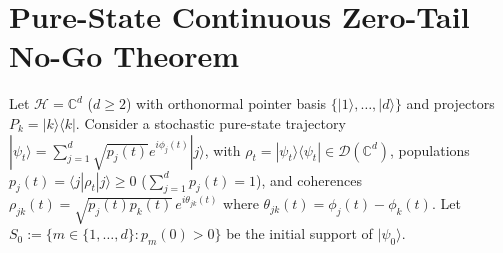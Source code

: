 \documentclass[aps,pra,10pt,twocolumn,superscriptaddress,amsmath,amssymb,floatfix]{revtex4-2}
\newcommand{\ket}[1]{|#1\rangle}
\newcommand{\bra}[1]{\langle #1|}
\newcommand{\ketbra}[2]{|#1\rangle\langle #2|}
\begin{document}
\section{Pure-State Continuous Zero-Tail No-Go Theorem}
\label{sec:nogo}

Let $\mathcal{H} = \mathbb{C}^d$ ($d \ge 2$) with orthonormal pointer basis $\{\ket{1},\dots,\ket{d}\}$ and projectors $P_k = \ketbra{k}{k}$. Consider a stochastic pure-state trajectory $\ket{\psi_t} = \sum_{j=1}^d \sqrt{p_j(t)} e^{i\phi_j(t)}\ket{j}$, with $\rho_t = \ketbra{\psi_t}{\psi_t} \in \mathcal{D}(\mathbb{C}^d)$, populations $p_j(t) = \bra{j}\rho_t\ket{j} \ge 0$ ($\sum_{j=1}^d p_j(t)=1$), and coherences $\rho_{jk}(t) = \sqrt{p_j(t)p_k(t)}\,e^{i\theta_{jk}(t)}$ where $\theta_{jk}(t) = \phi_j(t) - \phi_k(t)$. Let $S_0 := \{m \in \{1,\dots,d\} : p_m(0) > 0\}$ be the initial support of $\ket{\psi_0}$.
\end{document}
